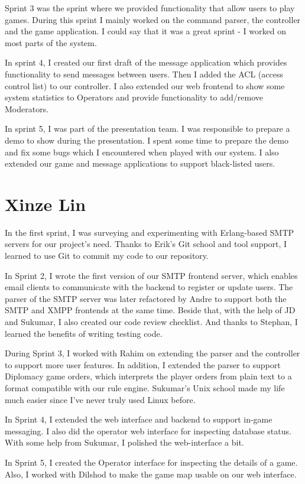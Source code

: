 \documentclass[11pt,a4paper]{report}
\begin{document}
Sprint 3 was the sprint where we provided functionality that allow users to play
games. During this sprint I mainly worked on the command parser, the controller
and the game application. I could say that it was a great sprint - I worked on
most parts of the system.

In sprint 4, I created our first draft of the message application which provides
functionality to send messages between users. Then I added the ACL (access
control list) to our controller. I also extended our web frontend to show some
system statistics to Operators and provide functionality to add/remove
Moderators.

In sprint 5, I was part of the presentation team. I was responsible to prepare a
demo to show during the presentation. I spent some time to prepare the demo and
fix some bugs which I encountered when played with our system. I also extended
our game and message applications to support black-listed users.

\section{Xinze Lin}
In the first sprint, I was surveying and experimenting with Erlang-based SMTP
servers for our project's need. Thanks to Erik's Git school and tool support, I
learned to use Git to commit my code to our repository.

In Sprint 2, I wrote the first version of our SMTP frontend server, which
enables email clients to communicate with the backend to register or update
users. The parser of the SMTP server was later refactored by Andre to support
both the SMTP and XMPP frontends at the same time. Beside that, with the help of
JD and Sukumar, I also created our code review checklist. And thanks to Stephan,
I learned the benefits of writing testing code.

During Sprint 3, I worked with Rahim on extending the parser and the controller
to support more user features. In addition, I extended the parser to support
Diplomacy game orders, which interprets the player orders from plain text to a
format compatible with our rule engine. Sukumar's Unix school made my life much
easier since I've never truly used Linux before.

In Sprint 4, I extended the web interface and backend to support in-game
messaging. I also did the operator web interface for inspecting database
status. With some help from Sukumar, I polished the web-interface a bit.

In Sprint 5, I created the Operator interface for inspecting the details of a
game. Also, I worked with Dilshod to make the game map usable on our web
interface.
\end{document}
